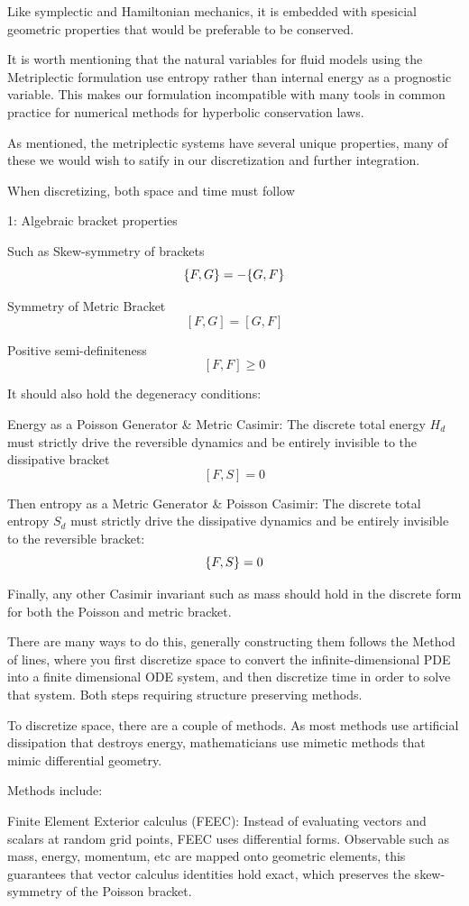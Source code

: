 Like symplectic and Hamiltonian mechanics, it is embedded with spesicial geometric properties that would be preferable to be conserved.

It is worth mentioning that the natural variables for fluid models using the Metriplectic formulation use entropy rather than internal energy as a prognostic variable. This makes our formulation incompatible with many tools in common practice for numerical methods for hyperbolic conservation laws.

As mentioned, the metriplectic systems have several unique properties, many of these we would wish to satify in our discretization and further integration.

When discretizing, both space and time must follow


1: Algebraic bracket properties

Such as Skew-symmetry of brackets
\[
\pb{F}{G} = - \pb{G}{F}
  \]

  Symmetry of Metric Bracket
\[
[F,G] = [G,F]
\]

Positive semi-definiteness
\[
    [F,F] \geq 0
  \]

  It should also hold the degeneracy conditions:

Energy as a Poisson Generator \& Metric Casimir: The discrete total energy $H_d$ must strictly drive the reversible dynamics and be entirely invisible to the dissipative bracket
\[
[F,S] = 0
  \]

  Then entropy as a Metric Generator \& Poisson Casimir: The discrete total entropy $S_d$ must strictly drive the dissipative dynamics and be entirely invisible to the reversible bracket:
\[
\pb{F}{S}=0
  \]

  Finally, any other Casimir invariant such as mass should hold in the discrete form for both the Poisson and metric bracket.


  There are many ways to do this, generally constructing them follows the Method of lines, where you first discretize space to convert the infinite-dimensional PDE into a finite dimensional ODE system, and then discretize time in order to solve that system. Both steps requiring structure preserving methods.

  To discretize space, there are a couple of methods. As most methods use artificial dissipation that destroys energy, mathematicians use mimetic methods that mimic differential geometry.

  Methods include:


  Finite Element Exterior calculus (FEEC): Instead of evaluating vectors and scalars at random grid points, FEEC uses differential forms. Observable such as mass, energy, momentum, etc are mapped onto geometric elements, this guarantees that vector calculus identities hold exact, which preserves the skew-symmetry of the Poisson bracket.

